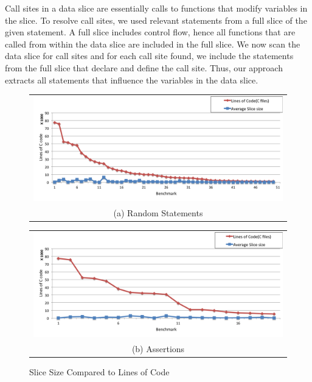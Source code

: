 \documentclass[12pt]{article}
\begin{document}
Call sites in a data slice are essentially calls to functions that modify variables in the slice. To resolve call sites, we used relevant statements from a full slice of the given statement. A full slice includes control flow, hence all functions that are called from within the data slice are included in the full slice. We now scan the data slice for call sites and for each call site found, we include the statements from the full slice that declare and define the call site. Thus, our approach extracts all statements that influence the variables in the data slice.\\

\begin{figure}[H]
  \centering
  \begin{tabular}{@{}c@{}}
    \includegraphics[width=5in]{slice-size-compare.png} \\[\abovecaptionskip]
    \small (a) Random Statements
  \end{tabular}

  \vspace{\floatsep}

  \begin{tabular}{@{}c@{}}
    \includegraphics[width=5in]{slice-size-compare-assert.png} \\[\abovecaptionskip]
    \small (b) Assertions
  \end{tabular}
  
  \caption{Slice Size Compared to Lines of Code}\label{slice size comparison}
\end{figure}
\end{document}
